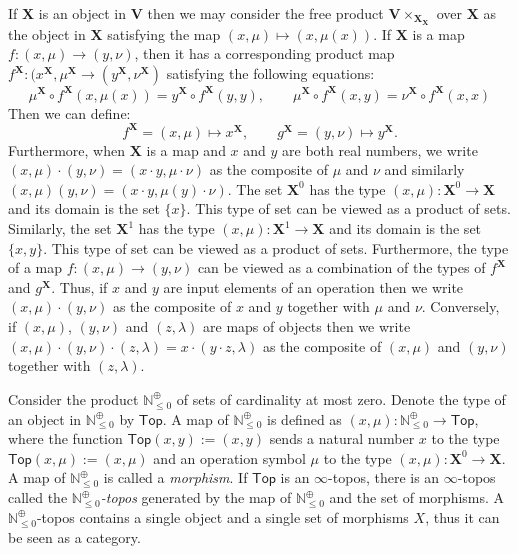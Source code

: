 \documentclass[a4paper,reqno,oneside]{article}
\begin{document}
If $\mathbf{X}$ is an object in $\mathbf{V}$ then we may consider the free product $\mathbf{V}\times_{\mathbf{X}}_{\mathbf{X}}$ over $\mathbf{X}$ as the object in $\mathbf{X}$ satisfying the map $(x,\mu)\mapsto (x,\mu(x))$. If $\mathbf{X}$ is a map $f:(x,\mu)\to (y,\nu)$, then it has a corresponding product map $f^{\mathbf{X}}:(x^{\mathbf{X}},\mu^{\mathbf{X}}\to (y^{\mathbf{X}},\nu^{\mathbf{X}})$ satisfying the following equations:
\[
\mu^{\mathbf{X}}\circ f^{\mathbf{X}}(x,\mu(x)) = y^{\mathbf{X}}\circ f^{\mathbf{X}}(y,y),\qquad \mu^{\mathbf{X}}\circ f^{\mathbf{X}}(x,y) = \nu^{\mathbf{X}}\circ f^{\mathbf{X}}(x,x)
\]
Then we can define:
\[
f^{\mathbf{X}}=(x,\mu)\mapsto x^{\mathbf{X}},\qquad g^{\mathbf{X}}=(y,\nu)\mapsto y^{\mathbf{X}}.
\]
Furthermore, when $\mathbf{X}$ is a map and $x$ and $y$ are both real numbers, we write $(x,\mu)\cdot (y,\nu) = (x\cdot y, \mu\cdot \nu)$ as the composite of $\mu$ and $\nu$
and similarly $(x,\mu)(y,\nu) = (x\cdot y,\mu(y)\cdot \nu)$. The set $\mathbf{X}^{0}$ has the type $(x,\mu):\mathbf{X}^0\to\mathbf{X}$ and its domain is the set $\{x\}$. This type of set can be viewed as a product of sets. Similarly, the set $\mathbf{X}^1$ has the type $(x,\mu):\mathbf{X}^1\to\mathbf{X}$ and its domain is the set $\{x,y\}$. This type of set can be viewed as a product of sets. Furthermore, the type of a map $f:(x,\mu)\to (y,\nu)$ can be viewed as a combination of the types of $f^{\mathbf{X}}$ and $g^{\mathbf{X}}$. Thus, if $x$ and $y$ are input elements of an operation then we write $(x,\mu)\cdot (y,\nu)$ as the composite of $x$ and $y$ together with $\mu$ and $\nu$. Conversely, if $(x,\mu)$, $(y,\nu)$ and $(z,\lambda)$ are maps of objects then we write $(x,\mu)\cdot (y,\nu)\cdot (z,\lambda)=x\cdot (y\cdot z,\lambda)$ as the composite of $(x,\mu)$ and $(y,\nu)$ together with $(z,\lambda)$.  

Consider the product $\mathbb{N}_{\leq0}^\oplus$ of sets of cardinality at most zero. Denote the type of an object in $\mathbb{N}_{\leq0}^\oplus$ by $\mathsf{Top}$. A map of $\mathbb{N}_{\leq0}^\oplus$ is defined as $(x,\mu):\mathbb{N}_{\leq0}^\oplus\to\mathsf{Top}$, where the function $\mathsf{Top}(x,y):=(x,y)$ sends a natural number $x$ to the type $\mathsf{Top}(x,\mu):=(x,\mu)$ and an operation symbol $\mu$ to the type $(x,\mu):\mathbf{X}^0\to\mathbf{X}$. A map of $\mathbb{N}_{\leq0}^\oplus$ is called a \textit{morphism}. If $\mathsf{Top}$ is an $\infty$-topos, there is an $\infty$-topos called the \textit{$\mathbb{N}_{\leq0}^\oplus$-topos} generated by the map of $\mathbb{N}_{\leq0}^\oplus$ and the set of morphisms.  A $\mathbb{N}_{\leq0}^\oplus$-topos contains a single object and a single set of morphisms $X$, thus it can be seen as a category. 
\end{document}
